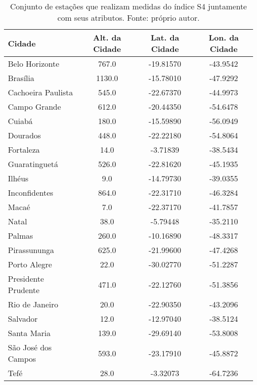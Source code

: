 \begin{table}
\begin{center}
\begin{tabular}{|l|c|c|c|}
\hline
Cidade              &   Alt. da Cidade &  Lat. da Cidade &  Lon. da Cidade \\ \hline
Belo Horizonte      &            767.0 &       -19.81570 &        -43.9542 \\ \hline
Brasília            &           1130.0 &       -15.78010 &        -47.9292 \\ \hline
Cachoeira Paulista  &            545.0 &       -22.67370 &        -44.9973 \\ \hline
Campo Grande        &            612.0 &       -20.44350 &        -54.6478 \\ \hline
Cuiabá              &            180.0 &       -15.59890 &        -56.0949 \\ \hline
Dourados            &            448.0 &       -22.22180 &        -54.8064 \\ \hline
Fortaleza           &             14.0 &        -3.71839 &        -38.5434 \\ \hline
Guaratinguetá       &            526.0 &       -22.81620 &        -45.1935 \\ \hline
Ilhéus              &              9.0 &       -14.79730 &        -39.0355 \\ \hline
Inconfidentes       &            864.0 &       -22.31710 &        -46.3284 \\ \hline
Macaé               &              7.0 &       -22.37170 &        -41.7857 \\ \hline
Natal               &             38.0 &        -5.79448 &        -35.2110 \\ \hline
Palmas              &            260.0 &       -10.16890 &        -48.3317 \\ \hline
Pirassununga        &            625.0 &       -21.99600 &        -47.4268 \\ \hline
Porto Alegre        &             22.0 &       -30.02770 &        -51.2287 \\ \hline
Presidente Prudente &            471.0 &       -22.12760 &        -51.3856 \\ \hline
Rio de Janeiro      &             20.0 &       -22.90350 &        -43.2096 \\ \hline
Salvador            &             12.0 &       -12.97040 &        -38.5124 \\ \hline
Santa Maria         &            139.0 &       -29.69140 &        -53.8008 \\ \hline
São José dos Campos &            593.0 &       -23.17910 &        -45.8872 \\ \hline
Tefé                &             28.0 &        -3.32073 &        -64.7236 \\ \hline
\end{tabular}
\end{center}

\vspace{12pt}

\caption{Conjunto de estações que realizam medidas do índice S4 juntamente com seus atributos. Fonte: próprio autor.}
\label{tab:stations}
\end{table}

